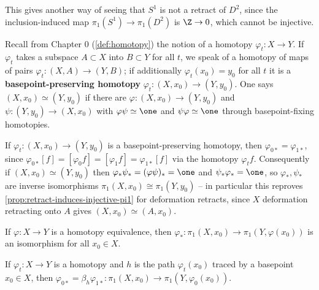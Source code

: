 This gives another way of seeing that $S^1$ is not a retract of $D^2$, since the
inclusion-induced map $\pi_1(S^1)\to\pi_1(D^2)$ is $\Z\to 0$, which cannot be injective.

\begin{definition}
\label{def:based-homotopy-equivalence}
Recall from Chapter 0 (\cref{def:homotopy}) the notion of a homotopy $\varphi_t : X \to Y$.
If $\varphi_t$ takes a subspace $A\subset X$ into $B\subset Y$ for all $t$, we speak of a homotopy
of maps of pairs $\varphi_t : (X,A) \to (Y,B)$; if additionally $\varphi_t(x_0)=y_0$ for all $t$ it is a
\textbf{basepoint-preserving homotopy} $\varphi_t : (X,x_0)\to(Y,y_0)$. One says
$(X,x_0) \simeq (Y,y_0)$ if there are $\varphi : (X,x_0)\to(Y,y_0)$ and $\psi : (Y,y_0)\to(X,x_0)$ with
$\varphi\psi \simeq \one$ and $\psi\varphi \simeq \one$ through basepoint-fixing homotopies.
\end{definition}

If $\varphi_t : (X,x_0)\to(Y,y_0)$ is a basepoint-preserving homotopy, then
$\varphi_{0*} = \varphi_{1*}$, since $\varphi_{0*}[f] = [\varphi_0 f] = [\varphi_1 f] = \varphi_{1*}[f]$ via the homotopy
$\varphi_t f$. Consequently if $(X,x_0)\simeq(Y,y_0)$ then $\varphi_*\psi_* = (\varphi\psi)_* = \one$ and
$\psi_*\varphi_* = \one$, so $\varphi_*,\psi_*$ are inverse isomorphisms $\pi_1(X,x_0)\cong\pi_1(Y,y_0)$ -- in
particular this reproves \cref{prop:retract-induces-injective-pi1} for deformation retracts,
since $X$ deformation retracting onto $A$ gives $(X,x_0)\simeq(A,x_0)$.

\begin{proposition}
\label{prop:homotopy-equivalence-induces-pi1-iso}
If $\varphi : X \to Y$ is a homotopy equivalence, then
$\varphi_* : \pi_1(X,x_0) \to \pi_1(Y,\varphi(x_0))$ is an isomorphism for all $x_0 \in X$.
\end{proposition}

\begin{lemma}
\label{lem:basepoint-change-homotopy}
If $\varphi_t : X \to Y$ is a homotopy and $h$ is the path $\varphi_t(x_0)$ traced by a basepoint
$x_0 \in X$, then $\varphi_{0*} = \beta_h \varphi_{1*} : \pi_1(X,x_0) \to \pi_1(Y,\varphi_0(x_0))$.
\end{lemma}



